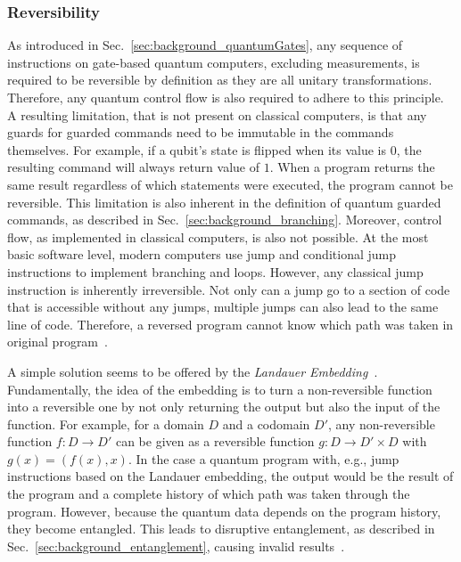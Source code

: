 \subsubsection{Reversibility}
\label{sec:background_controlflow_reversibility}
As introduced in Sec.~\ref{sec:background_quantumGates}, any sequence of instructions on gate-based quantum computers, excluding measurements, is required to be reversible by definition as they are all unitary transformations. Therefore, any quantum control flow is also required to adhere to this principle. A resulting limitation, that is not present on classical computers, is that any guards for guarded commands need to be immutable in the commands themselves. For example, if a qubit's state is flipped when its value is $0$, the resulting command will always return value of $1$. When a program returns the same result regardless of which statements were executed, the program cannot be reversible. This limitation is also inherent in the definition of quantum guarded commands, as described in Sec.~\ref{sec:background_branching}.
Moreover, control flow, as implemented in classical computers, is also not possible. At the most basic software level, modern computers use jump and conditional jump instructions to implement branching and loops. However, any classical jump instruction is inherently irreversible. Not only can a jump go to a section of code that is accessible without any jumps, multiple jumps can also lead to the same line of code. Therefore, a reversed program cannot know which path was taken in original program~\cite{YVC24}.  

A simple solution seems to be offered by the \emph{Landauer Embedding}~\cite{Land61}. Fundamentally, the idea of the embedding is to turn a non-reversible function into a reversible one by not only returning the output but also the input of the function. For example, for a domain $D$ and a codomain $D'$, any non-reversible function $f : D \to D'$ can be given as a reversible function $g : D \to D' \times D$ with $g(x) = (f(x), x)$. In the case a quantum program with, e.g., jump instructions based on the Landauer embedding, the output would be the result of the program and a complete history of which path was taken through the program. However, because the quantum data depends on the program history, they become entangled. This leads to disruptive entanglement, as described in Sec.~\ref{sec:background_entanglement}, causing invalid results~\cite{YVC24}. 


